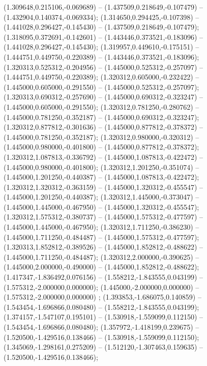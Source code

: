  (1.309648,0.215106,-0.069689) -- (1.437509,0.218649,-0.107479) -- (1.432904,0.140374,-0.069334);
 (1.314650,0.294425,-0.107398) -- (1.441028,0.296427,-0.145430) -- (1.437509,0.218649,-0.107479);
 (1.318095,0.372691,-0.142601) -- (1.443446,0.373521,-0.183096) -- (1.441028,0.296427,-0.145430);
 (1.319957,0.449610,-0.175151) -- (1.444751,0.449750,-0.220389) -- (1.443446,0.373521,-0.183096);
 (1.320313,0.525312,-0.204956) -- (1.445000,0.525312,-0.257097) -- (1.444751,0.449750,-0.220389);
 (1.320312,0.605000,-0.232422) -- (1.445000,0.605000,-0.291550) -- (1.445000,0.525312,-0.257097);
 (1.320313,0.690312,-0.257690) -- (1.445000,0.690312,-0.323247) -- (1.445000,0.605000,-0.291550);
 (1.320312,0.781250,-0.280762) -- (1.445000,0.781250,-0.352187) -- (1.445000,0.690312,-0.323247);
 (1.320312,0.877812,-0.301636) -- (1.445000,0.877812,-0.378372) -- (1.445000,0.781250,-0.352187);
 (1.320312,0.980000,-0.320312) -- (1.445000,0.980000,-0.401800) -- (1.445000,0.877812,-0.378372);
 (1.320312,1.087813,-0.336792) -- (1.445000,1.087813,-0.422472) -- (1.445000,0.980000,-0.401800);
 (1.320312,1.201250,-0.351074) -- (1.445000,1.201250,-0.440387) -- (1.445000,1.087813,-0.422472);
 (1.320312,1.320312,-0.363159) -- (1.445000,1.320312,-0.455547) -- (1.445000,1.201250,-0.440387);
 (1.320312,1.445000,-0.373047) -- (1.445000,1.445000,-0.467950) -- (1.445000,1.320312,-0.455547);
 (1.320312,1.575312,-0.380737) -- (1.445000,1.575312,-0.477597) -- (1.445000,1.445000,-0.467950);
 (1.320312,1.711250,-0.386230) -- (1.445000,1.711250,-0.484487) -- (1.445000,1.575312,-0.477597);
 (1.320313,1.852812,-0.389526) -- (1.445000,1.852812,-0.488622) -- (1.445000,1.711250,-0.484487);
 (1.320312,2.000000,-0.390625) -- (1.445000,2.000000,-0.490000) -- (1.445000,1.852812,-0.488622);
 (1.417347,-1.836492,0.076156) -- (1.558212,-1.843555,0.043199) -- (1.575312,-2.000000,0.000000);
 (1.445000,-2.000000,0.000000) -- (1.575312,-2.000000,0.000000) ;
 (1.393853,-1.686075,0.140859) -- (1.543454,-1.696866,0.080480) -- (1.558212,-1.843555,0.043199);
 (1.374157,-1.547107,0.195101) -- (1.530918,-1.559099,0.112150) -- (1.543454,-1.696866,0.080480);
 (1.357972,-1.418199,0.239675) -- (1.520500,-1.429516,0.138466) -- (1.530918,-1.559099,0.112150);
 (1.345069,-1.298161,0.275209) -- (1.512120,-1.307463,0.159635) -- (1.520500,-1.429516,0.138466);
